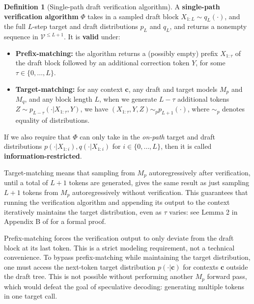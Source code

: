 \documentclass{article}
\theoremstyle{plain}
\theoremstyle{definition}
\newtheorem{definition}[theorem]{Definition}
\theoremstyle{remark}
\newcommand{\V}{\mathcal{V}}
\newcommand{\con}{\boldsymbol{c}}
\begin{document}
\begin{definition}[Single-path draft verification algorithm] A \textbf{single-path verification algorithm} $\Phi$ takes in a sampled draft block $X_{1:L} \sim q_L(\cdot)$, and the full $L$-step target and draft distributions $p_L$ and $q_L$, and returns a nonempty sequence in $\V^{\leq L+1}$. It is \textbf{valid} under:
\begin{itemize}
    \item \textbf{Prefix-matching:} the algorithm returns a (possibly empty) prefix $X_{1:\tau}$ of the draft block followed by an additional correction token $Y$, for some $\tau \in \{0,\ldots,L\}$.
    \item \textbf{Target-matching:} for any context $\con$, any draft and target models $M_p$ and $M_q$, and any block length $L$, when we generate $L-\tau$ additional tokens $Z \sim p_{L-\tau}(\cdot|X_{1:\tau},Y)$,  we have $(X_{1:\tau},Y,Z) \sim_p p_{L+1}(\cdot)$, where $\sim_p$ denotes equality of distributions.
\end{itemize}
If we also require that $\Phi$ can only take in the \emph{on-path} target and draft distributions $p(\cdot|X_{1:i}),q(\cdot|X_{1:i})$ for $i \in \{0,\ldots,L\}$, then it is called \textbf{information-restricted}.
\label{def:single}
\end{definition}

Target-matching means that sampling from $M_p$ autoregressively after verification, until a total of $L+1$ tokens are generated, gives the same result as just sampling $L+1$ tokens from $M_p$ autoregressively without verification. This guarantees that running the verification algorithm and appending its output to the context iteratively maintains the target distribution, even as $\tau$ varies: see Lemma 2 in Appendix B of \citet{sun2024block} for a formal proof.

Prefix-matching forces the verification output to only deviate from the draft block at its last token. This is a strict modeling requirement, not a technical convenience. To bypass prefix-matching while maintaining the target distribution, one must access the next-token target distribution $p(\cdot | \con)$ for contexts $\con$ outside the draft tree. This is not possible without performing another $M_p$ forward pass, which would defeat the goal of speculative decoding: generating multiple tokens in one target call. 

\end{document}
